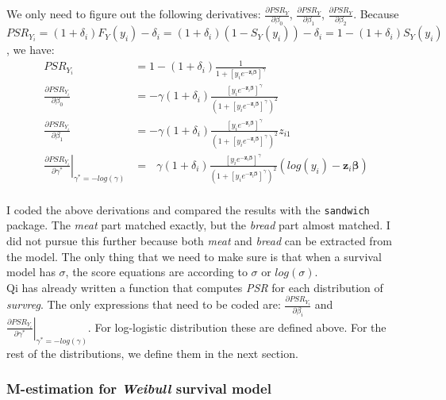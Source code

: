 \documentclass[]{article}
\begin{document}
We only need to figure out the following derivatives: $\frac{\partial PSR_Y}{\partial \beta_0}$, $\frac{\partial PSR_Y}{\partial \beta_1}$, $\frac{\partial PSR_Y}{\partial \beta_2}$. Because $PSR_{Y_i} = (1+\delta_i)F_Y(y_i) - \delta_i = (1+\delta_i)(1 - S_Y(y_i)) - \delta_i = 1 - (1+\delta_i)S_Y(y_i)$, we have:
  $$
  \begin{aligned}
    PSR_{Y_i} &=  1 - (1+\delta_i) \frac{1}{1+\left[y_i e^{-\pmb{z}_i\pmb{\beta}}\right]^{ \gamma}} \\
    \frac{\partial PSR_{Y_i}}{\partial \beta_0} &= - \gamma(1+\delta_i) \frac{  \left[y_i e^{-\pmb{z}_i\pmb{\beta}}    \right]^{ \gamma}  }{    \left(1+\left[y_i e^{-\pmb{z}_i\pmb{\beta}}    \right]^{ \gamma}\right)^2} \\
    \frac{\partial PSR_{Y_i}}{\partial \beta_1} &= - \gamma(1+\delta_i) \frac{  \left[y_i e^{-\pmb{z}_i\pmb{\beta}}    \right]^{ \gamma}  }{    \left(1+\left[y_i e^{-\pmb{z}_i\pmb{\beta}}    \right]^{ \gamma}\right)^2}  z_{i1}\\
    \left. \frac{\partial PSR_{Y_i}}{\partial \gamma^*} \right|_{\gamma^* = -log(\gamma)} &= ~~~ \gamma(1+\delta_i)\frac{    \left[y_i e^{-\pmb{z}_i\pmb{\beta}}    \right]^{ \gamma}  }{    \left(1+\left[y_i e^{-\pmb{z}_i\pmb{\beta}}    \right]^{ \gamma}\right)^2}(log(y_i) - \pmb{z}_i\pmb{\beta}) \\
  \end{aligned}
  $$

I coded the above derivations and compared the results with the \texttt{sandwich} package. The \emph{meat} part matched exactly, but the \emph{bread} part almost matched. I did not pursue this further because both \emph{meat} and \emph{bread} can be extracted from the model. The only thing that we need to make sure is that when a survival model has $\sigma$,  the score equations are according to $\sigma$ or $log(\sigma)$.\\
Qi has already written a function that computes \emph{PSR} for each distribution of \emph{survreg}. The only expressions that need to be coded are:  $\frac{\partial PSR_{Y_i}}{\partial \beta_i}$ and $\left. \frac{\partial PSR_{Y_i}}{\partial \gamma^*} \right|_{\gamma^* = -log(\gamma)}$. For log-logistic distribution these are defined above. For the rest of the distributions, we define them in the next section.

\subsubsection{M-estimation for \emph{Weibull} survival model}
\label{MEst:weibull}
\end{document}
